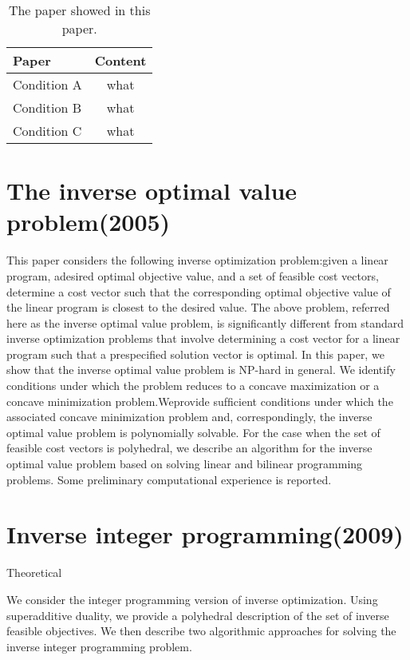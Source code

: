 \documentclass[UTF8]{article}
\begin{document}
\begin{table}[ht]

\tabcolsep=70pt

\small\renewcommand{}

\caption{The paper showed in this paper.\label{tab:1}}

{\begin{tabular}{lc}
\hline
Paper & Content \\
\hline
Condition A & what \\
\hline
Condition B & what \\
\hline
Condition C & what \\
\hline
\end{tabular}}
{}
\end{table}


\section{The inverse optimal value problem(2005)}

This paper considers the following inverse optimization problem:given a linear program, adesired optimal objective value, and a set of feasible cost vectors, determine a cost vector such that the corresponding optimal objective value of the linear program is closest to the desired value.
The above problem, referred here as the inverse optimal value problem, is signiﬁcantly different from standard inverse optimization problems that involve determining a cost vector for a linear program such that a prespecified solution vector is optimal. In this paper, we show that the inverse optimal value problem is NP-hard in general. We identify conditions under which the problem reduces to a concave maximization or a concave minimization problem.Weprovide sufﬁcient conditions under which the associated concave minimization problem and, correspondingly, the inverse optimal value problem is polynomially solvable. For the case when the set of feasible cost vectors is polyhedral, we describe an algorithm for the inverse optimal value problem based on solving linear and bilinear programming problems. Some preliminary computational experience is reported.


\section{Inverse integer programming(2009)}

Theoretical

We consider the integer programming version of inverse optimization. Using superadditive duality, we provide a polyhedral description of the set of inverse feasible objectives. We then describe two algorithmic approaches for solving the inverse integer programming problem.
\end{document}
